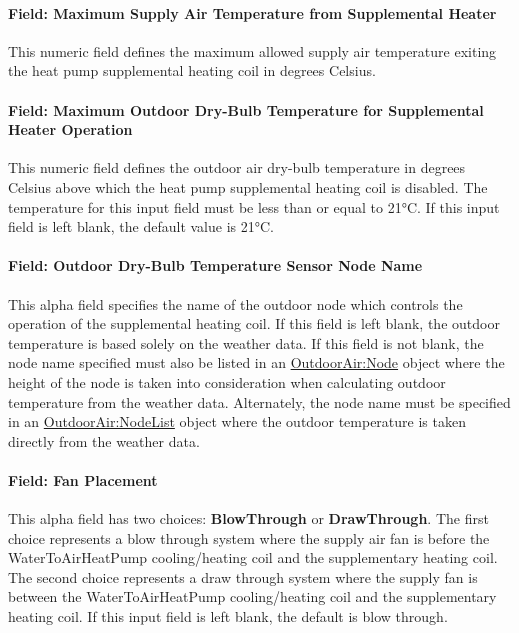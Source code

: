 \paragraph{Field: Maximum Supply Air Temperature from Supplemental Heater}\label{field-maximum-supply-air-temperature-from-supplemental-heater-2}

This numeric field defines the maximum allowed supply air temperature exiting the heat pump supplemental heating coil in degrees Celsius.

\paragraph{Field: Maximum Outdoor Dry-Bulb Temperature for Supplemental Heater Operation}\label{field-maximum-outdoor-dry-bulb-temperature-for-supplemental-heater-operation-3}

This numeric field defines the outdoor air dry-bulb temperature in degrees Celsius above which the heat pump supplemental heating coil is disabled. The temperature for this input field must be less than or equal to 21°C. If this input field is left blank, the default value is 21°C.

\paragraph{Field: Outdoor Dry-Bulb Temperature Sensor Node Name}\label{field-outdoor-dry-bulb-temperature-sensor-node-name-1}

This alpha field specifies the name of the outdoor node which controls the operation of the supplemental heating coil. If this field is left blank, the outdoor temperature is based solely on the weather data. If this field is not blank, the node name specified must also be listed in an \hyperref[outdoorairnode]{OutdoorAir:Node} object where the height of the node is taken into consideration when calculating outdoor temperature from the weather data. Alternately, the node name must be specified in an \hyperref[outdoorairnodelist]{OutdoorAir:NodeList} object where the outdoor temperature is taken directly from the weather data.

\paragraph{Field: Fan Placement}\label{field-fan-placement-6}

This alpha field has two choices: \textbf{BlowThrough} or \textbf{DrawThrough}. The first choice represents a blow through system where the supply air fan is before the WaterToAirHeatPump cooling/heating coil and the supplementary heating coil. The second choice represents a draw through system where the supply fan is between the WaterToAirHeatPump cooling/heating coil and the supplementary heating coil. If this input field is left blank, the default is blow through.

